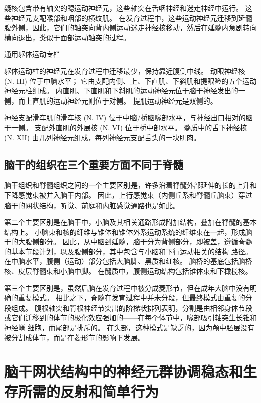 疑核包含带有轴突的鳃运动神经元，这些轴突在舌咽神经和迷走神经中运行。
这些神经元支配喉部和咽部的横纹肌。
在发育过程中，这些运动神经元迁移到延髓腹外侧，因此，它们的轴突向背内侧运动迷走神经核移动，然后在延髓内急剧转向横向退出，类似于面部运动轴突的过程。


通用躯体运动专栏

躯体运动柱的神经元在发育过程中迁移最少，保持靠近腹侧中线。
动眼神经核 (N. III) 位于中脑水平；
它由支配内侧、上、下直肌、下斜肌和提眼睑的五个运动神经元柱组成。
内直肌、下直肌和下斜肌的运动神经元位于脑干神经发出的一侧，而上直肌的运动神经元则位于对侧。
提肌运动神经元是双侧的。


神经支配滑车肌的滑车核 (N. IV) 位于中脑/桥脑喙部水平，与神经出口相对的脑干一侧。
支配外直肌的外展核 (N. VI) 位于桥中部水平。
髓质中的舌下神经核 (N. XII) 由几列神经元组成，每列神经元支配舌头的一块肌肉。



\subsection{脑干的组织在三个重要方面不同于脊髓}

脑干组织和脊髓组织之间的一个主要区别是，许多沿着脊髓外部延伸的长的上升和下降感觉束被并入脑干内部。
因此，上行感觉束（内侧丘系和脊髓丘脑束）穿过脑干的网状结构，听觉、前庭和内脏感觉通路也是如此。


第二个主要区别是在脑干中，小脑及其相关通路形成附加结构，叠加在脊髓的基本结构上。
小脑束和核的纤维与锥体和锥体外系运动系统的纤维束在一起，形成脑干的大腹侧部分。
因此，从中脑到延髓，脑干分为背侧部分，即被盖，遵循脊髓的基本节段计划，以及腹侧部分，其中包含与小脑和下行运动相关的结构 路径。
在中脑水平，腹侧（运动）部分包括大脑脚、黑质和红核。
脑桥的基底包括脑桥核、皮层脊髓束和小脑中脚。
在髓质中，腹侧运动结构包括锥体束和下橄榄核。


第三个主要区别是，虽然后脑在发育过程中被分成菱形节，但在成年大脑中没有明确的重复模式。
相比之下，脊髓在发育过程中并未分段，但最终模式由重复的分段组成。
腹根轴突和背根神经节突出的阶梯状排列表明，分割是由相邻身体节段或它们迁移到的体节的极化效应强加的——在每个体节中，喙部吸引轴突生长锥和神经嵴 细胞，而尾部是排斥的。
在头部，这种模式是缺乏的，因为颅中胚层没有被分割成体节，而是在菱形节的影响下发展。



\section{脑干网状结构中的神经元群协调稳态和生存所需的反射和简单行为}

